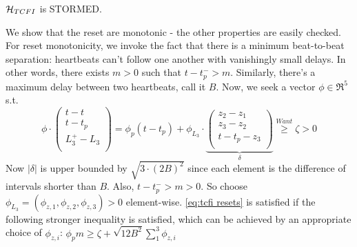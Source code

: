%
\begin{lemma}
	$\mathcal{H}_{TCFI}$ is STORMED.
\end{lemma}
\begin{prf}
We show that the reset are monotonic - the other properties are easily checked.
For reset monotonicity, we invoke the fact that there is a minimum beat-to-beat separation: heartbeats can't follow one another with vanishingly small delays. 
In other words, there exists $m>0$ such that $t - t_p^- > m$.
Similarly, there's a maximum delay between two heartbeats, call it $B$.
Now, we seek a vector $\phi \in \Re^5$ s.t. 
\begin{equation}
\label{eq:tcfi resets}
\phi \cdot \left(\begin{matrix}
t-t\\t - t_p\\L_3^+ - L_3\\
\end{matrix}
\right) = \phi_p(t-t_p) +\phi_{L_3} \cdot \underbrace{\left(\begin{matrix}
z_2-z_1\\z_3-z_2\\t-t_p - z_3\\
\end{matrix}
\right)}_{\delta} \stackrel{Want}{\geq} \zeta > 0
\end{equation} 
Now $|\delta|$ is upper bounded by $\sqrt{3\cdot (2B)^2}$ since each element is the difference of intervals shorter than $B$.
Also, $t-t_p^- > m > 0$.
So choose $\phi_{L_3} = (\phi_{z,1},\phi_{z,2},\phi_{z,3})>0$ element-wise.
\eqref{eq:tcfi resets} is satisfied if the following stronger inequality is satisfied, which can be achieved by an appropriate choice of $\phi_{z,i}$: \;
$\phi_p m \geq \zeta + \sqrt{12B^2}\sum_1^3\phi_{z,i}$
\end{prf}






